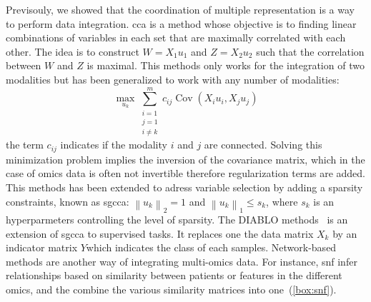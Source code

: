 \documentclass[../main.tex]{subfiles}
\begin{document}
	  Previsouly, we showed that the coordination of multiple representation is a way to perform data integration.
	  \Gls{cca} is a method whose objective is to finding linear combinations of variables in each set that are maximally correlated with each other.
	  The idea is to construct \(W=X_1u_1\) and \(Z=X_2u_2\) such that the correlation between \(W\) and \(Z\) is maximal.
	  This methods only works for the integration of two modalities but has been generalized to work with any number of modalities:
	  \begin{equation}
	    \max_{u_k} \sum_{\substack{i=1 \\ j=1 \\ i\neq k}}^{m} c_{ij}\operatorname{Cov}\left(X_iu_i,X_ju_j\right)
	  \end{equation}
	  the term \(c_{ij}\) indicates if the modality \(i\) and \(j\) are connected.
	  Solving this minimization problem implies the inversion of the covariance matrix, which in the case of omics data is often not invertible therefore regularization terms are added.
	  This methods has been extended to adress variable selection by adding a sparsity constraints, known as \gls{sgcca}: \({\left\|u_k \right\|}_2 = 1\) and \({\left\|u_k \right\|}_1 \leq s_k\), where \(s_k\) is an hyperparmeters controlling the level of sparsity.
	  The DIABLO methods~\cite{DIABLO} is an extension of \gls{sgcca} to supervised tasks.
	  It replaces one the data matrix \(X_k\) by an indicator matrix \(Y\)which indicates the class of each samples.
	  Network-based methods are another way of integrating multi-omics data.
	  For instance, \gls{snf} infer relationships based on similarity between patients or features in the different omics, and the combine the various similarity matrices into one~(\cref{box:snf}).
\end{document}
